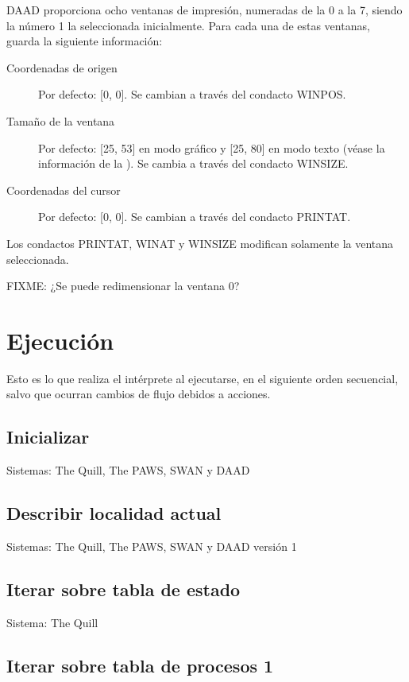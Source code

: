 \documentclass[11pt, a5paper]{article}
\newcommand{\quill}{\textsf{The Quill}\xspace}
\newcommand{\paw}{\textsf{The PAWS}\xspace}
\newcommand{\swan}{\textsf{SWAN}\xspace}
\newcommand{\daad}{\textsf{DAAD}\xspace}
\newcommand{\sistema}[1]{\noindent Sistema: #1 \nopagebreak}
\newcommand{\sistemas}[1]{\noindent Sistemas: #1 \nopagebreak}
\begin{document}
\daad proporciona ocho ventanas de impresión, numeradas de la 0 a la 7, siendo la número 1 la seleccionada inicialmente. Para cada una de estas ventanas, guarda la siguiente información:

\begin{description}
  \item[Coordenadas de origen] Por defecto: [0, 0]. Se cambian a través del condacto WINPOS.

  \item[Tamaño de la ventana] Por defecto: [25, 53] en modo gráfico y [25, 80] en modo texto (véase la información de la ). Se cambia a través del condacto WINSIZE.

  \item[Coordenadas del cursor] Por defecto: [0, 0]. Se cambian a través del condacto PRINTAT.
\end{description}

Los condactos PRINTAT, WINAT y WINSIZE modifican solamente la ventana seleccionada.

FIXME: ¿Se puede redimensionar la ventana 0?


\section{Ejecución}

Esto es lo que realiza el intérprete al ejecutarse, en el siguiente orden secuencial, salvo que ocurran cambios de flujo debidos a acciones.

\subsection{Inicializar}

\sistemas{\quill, \paw, \swan y \daad}

\subsection{Describir localidad actual}

\sistemas{\quill, \paw, \swan y \daad versión 1}

\subsection{Iterar sobre tabla de estado}

\sistema{\quill}

\subsection{Iterar sobre tabla de procesos 1}
\end{document}
